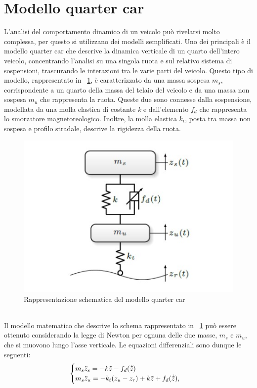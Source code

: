 \section{Modello quarter car}
L'analisi del comportamento dinamico di un veicolo può rivelarsi molto complessa, per questo si utilizzano dei modelli semplificati. Uno dei principali è il modello quarter car che descrive la dinamica verticale di un quarto dell'intero veicolo, concentrando l'analisi su una singola ruota e sul relativo sistema di sospensioni, trascurando le interazioni tra le varie parti del veicolo. Questo tipo di modello, rappresentato in \figurename \  \ref{fig:quarter-car}, è caratterizzato da una massa sospesa \textit{$m_s$}, corrispondente a un quarto della massa del telaio del veicolo e da una massa non sospesa \textit{$m_u$} che rappresenta la ruota. Queste due sono connesse dalla sospensione, modellata da una molla elastica di costante \textit{k} e dall'elemento \textit{$f_d$} che rappresenta lo smorzatore magnetoreologico. Inoltre, la molla elastica \textit{$k_t$}, posta tra massa non sospesa e profilo stradale, descrive la rigidezza della ruota.
\begin{figure}[hbt]
	\centering
	\includegraphics[scale=0.8]{figure/modello-quarter-car.jpg}
	\caption{Rappresentazione schematica del modello quarter car}
	\label{fig:quarter-car}
\end{figure}\\
Il modello matematico che descrive lo schema rappresentato in \figurename \ \ref{fig:quarter-car} può essere ottenuto considerando la legge di Newton per ognuna delle due masse, \textit{$m_s$} e \textit{$m_u$}, che si muovono lungo l'asse verticale. Le equazioni differenziali sono dunque le seguenti:
\begin{equation}
	\centering
	\begin{cases}
		m_s\ddot{z}_s = -k\tilde{z} - f_d(\dot{\tilde{z}})\\
		m_s\ddot{z}_u = -k_t(z_u - z_r) + k\tilde{z} + f_d(\dot{\tilde{z}}),\\
	\end{cases}
	\label{eqprinc}
\end{equation}\\
